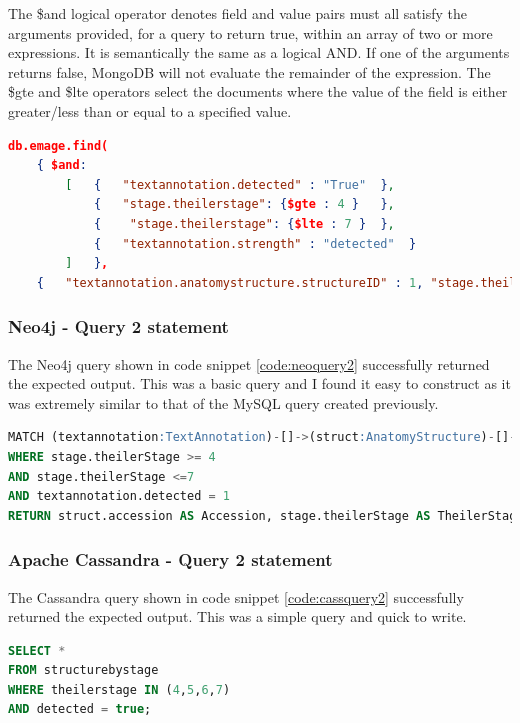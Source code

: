 The \$and logical operator denotes field and value pairs must all satisfy the arguments provided, for a query to return true, within an array of two or more expressions. It is semantically the same as a logical AND. If one of the arguments returns false, MongoDB will not evaluate the remainder of the expression. The \$gte and \$lte operators select the documents where the value of the field is either greater/less than or equal to a specified value.

\begin{lstlisting}[language=json, caption=MongoDB query 2 statement. All structures between Theiler Stage X and Y., label=code:mongoquery2]
db.emage.find(
	{ $and:
		[	{	"textannotation.detected" : "True"	},
			{	"stage.theilerstage": {$gte : 4 }	},
			{	 "stage.theilerstage": {$lte : 7 }	},
			{	"textannotation.strength" : "detected"	}
		]	},
	{	"textannotation.anatomystructure.structureID" : 1, "stage.theilerstage" : 1, "_id" : 0	}	).pretty();
\end{lstlisting}

\subsubsection*{Neo4j - Query 2 statement}\label{neoquery2statement}
The Neo4j query shown in code snippet \ref{code:neoquery2} successfully returned the expected output. This was a basic query and I found it easy to construct as it was extremely similar to that of the MySQL query created previously.

\begin{lstlisting}[language=SQL, caption=Neo4j query 2 statement. All structures between Theiler Stage X and Y., label=code:neoquery2]
MATCH (textannotation:TextAnnotation)-[]->(struct:AnatomyStructure)-[]->(stage:Stage)
WHERE stage.theilerStage >= 4
AND stage.theilerStage <=7
AND textannotation.detected = 1
RETURN struct.accession AS Accession, stage.theilerStage AS TheilerStage;
\end{lstlisting}

\subsubsection*{Apache Cassandra - Query 2 statement}\label{cassquery2statement}
The Cassandra query shown in code snippet \ref{code:cassquery2} successfully returned the expected output. This was a simple query and quick to write.

\begin{lstlisting}[language=SQL, caption=Cassandra query 2 statement. All structures between Theiler Stage X and Y., label=code:cassquery2]
SELECT *
FROM structurebystage
WHERE theilerstage IN (4,5,6,7)
AND detected = true;
\end{lstlisting}

